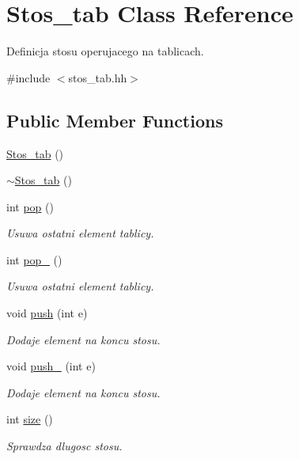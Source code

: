 \hypertarget{class_stos__tab}{\section{\-Stos\-\_\-tab \-Class \-Reference}
\label{class_stos__tab}
}


\-Definicja stosu operujacego na tablicach.  




{\ttfamily \#include $<$stos\-\_\-tab.\-hh$>$}

\subsection*{\-Public \-Member \-Functions}
\begin{DoxyCompactItemize}
\item 
\hyperlink{class_stos__tab_a6975cc04c513cac9a0db764b6d1cfe48}{\-Stos\-\_\-tab} ()
\item 
\hyperlink{class_stos__tab_a57302a02d5fc6ae8c6469bb2c6a2d67c}{$\sim$\-Stos\-\_\-tab} ()
\item 
int \hyperlink{class_stos__tab_a6680cd19cb9a759f2b8ed9ad99f878be}{pop} ()
\begin{DoxyCompactList}\small\item\em \-Usuwa ostatni element tablicy. \end{DoxyCompactList}\item 
int \hyperlink{class_stos__tab_a963aa3e29d1aada0adb13838dca0fc1f}{pop\-\_} ()
\begin{DoxyCompactList}\small\item\em \-Usuwa ostatni element tablicy. \end{DoxyCompactList}\item 
void \hyperlink{class_stos__tab_ad8dc0731fd7bf7ddd00a792ca6dc0a5b}{push} (int e)
\begin{DoxyCompactList}\small\item\em \-Dodaje element na koncu stosu. \end{DoxyCompactList}\item 
void \hyperlink{class_stos__tab_ad1971d3f011bf84e8ffa2c3a69638668}{push\-\_} (int e)
\begin{DoxyCompactList}\small\item\em \-Dodaje element na koncu stosu. \end{DoxyCompactList}\item 
int \hyperlink{class_stos__tab_acccd52de6a1b760da4223810d6063675}{size} ()
\begin{DoxyCompactList}\small\item\em \-Sprawdza dlugosc stosu. \end{DoxyCompactList}\item 

\end{DoxyCompactItemize}
